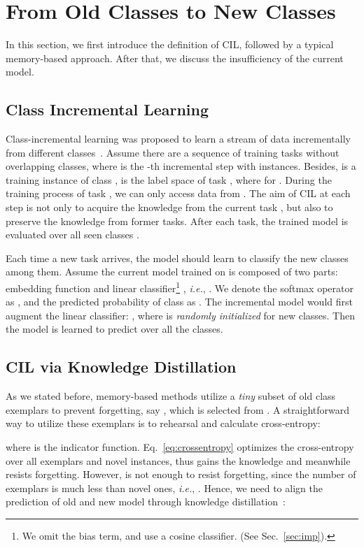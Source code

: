 \documentclass[sigconf]{acmart}
\newcommand{\ie}{\emph{i.e.}}
\begin{document}
\section{From Old Classes to New Classes}
In this section, we first introduce the definition of CIL, followed by a typical memory-based approach.
After that, we discuss the insufficiency of the current model.
\subsection{Class Incremental Learning}
Class-incremental learning was proposed to learn a stream of data incrementally from different classes~\cite{rebuffi2017icarl}. Assume there are a sequence of   training tasks  without overlapping classes, where  is the -th incremental step with  instances. Besides,   is a training instance of class ,  is the label space of task , where
 for . 
During the training process of task , we can only access data from .  
The aim of CIL at each step is not only to acquire the knowledge from the current task  , but also to preserve the knowledge from former tasks. 
After each task, the trained model is evaluated over all seen classes .

Each time a new task  arrives, the model should learn to classify the new classes among them. Assume the current model  trained on   is composed of two parts: embedding  function  and linear classifier\footnote{We omit the bias term, and use a cosine classifier. (See Sec.~\ref{sec:imp}).} , \ie, . 
We denote the softmax operator as , and the predicted probability of class  as .
The incremental model would first augment the linear classifier: , where  is \emph{randomly initialized} for new classes. Then the model is learned to predict over all the  classes.

\subsection{CIL via Knowledge Distillation}

As we stated before, memory-based methods utilize a \emph{tiny} subset of old class exemplars to prevent forgetting, say , which is selected from . A straightforward way to utilize these exemplars is to rehearsal and calculate cross-entropy:

where  is the indicator function. Eq.~\ref{eq:crossentropy} optimizes the cross-entropy over all exemplars and novel instances, thus gains the knowledge and meanwhile resists forgetting.
However,  is not enough to resist  forgetting, since the number of exemplars is much less than novel ones, \ie, .
Hence, we need to align the prediction of old  and new model  through knowledge distillation~\cite{hinton2015distilling}:
\end{document}
